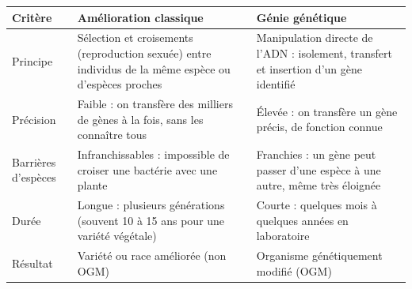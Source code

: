 \documentclass[11pt]{article}
\begin{document}
\begin{center}
\begin{tabularx}{\linewidth}{|l|X|X|}
\hline
\rowcolor{popblueL} \textbf{Critère} & \textbf{Amélioration classique} & \textbf{Génie génétique} \\
\hline
Principe & Sélection et croisements (reproduction sexuée) entre individus de la même espèce ou d'espèces proches & Manipulation directe de l'ADN : isolement, transfert et insertion d'un gène identifié \\
\hline
Précision & Faible : on transfère des milliers de gènes à la fois, sans les connaître tous & Élevée : on transfère un gène précis, de fonction connue \\
\hline
Barrières d'espèces & Infranchissables : impossible de croiser une bactérie avec une plante & Franchies : un gène peut passer d'une espèce à une autre, même très éloignée \\
\hline
Durée & Longue : plusieurs générations (souvent 10 à 15 ans pour une variété végétale) & Courte : quelques mois à quelques années en laboratoire \\
\hline
Résultat & Variété ou race améliorée (non OGM) & Organisme génétiquement modifié (OGM) \\
\hline
\end{tabularx}
\end{center}
\end{document}

